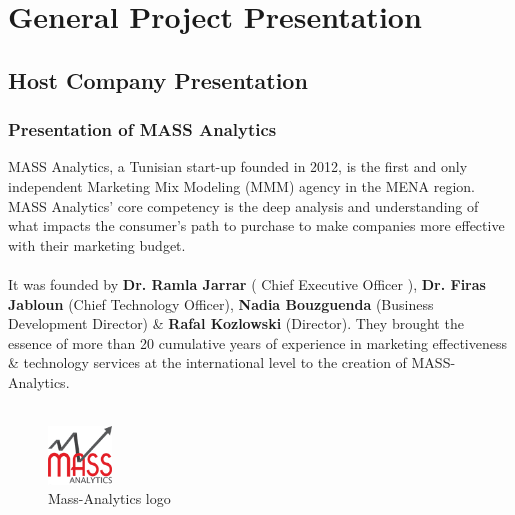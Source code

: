 

	
	\chapter{General Project Presentation}


	\section{Host Company Presentation}
	
	\subsection{Presentation of MASS Analytics}
	MASS Analytics, a Tunisian start-up founded in 2012, is the first and only independent Marketing Mix Modeling (MMM) agency in the MENA region. MASS Analytics’ core competency is the deep analysis and understanding of what impacts the consumer's path to purchase to make companies more effective with their marketing budget.
	\\
	\\
	It was founded by \textbf{Dr. Ramla Jarrar } ( Chief Executive Officer ),  \textbf{Dr. Firas Jabloun } (Chief Technology Officer), \textbf{Nadia Bouzguenda} (Business Development Director) \& \textbf{Rafal Kozlowski} (Director). They brought the essence of more than 20 cumulative years of experience in marketing effectiveness \& technology services at the international level to the creation of MASS-Analytics. \cite{ref1}
	\\
	\\
	\begin{figure}[h]
	\centering
	\includegraphics[width=0.15\textwidth]{Mass_logo.png}
	\caption{Mass-Analytics logo}
    \end{figure}
